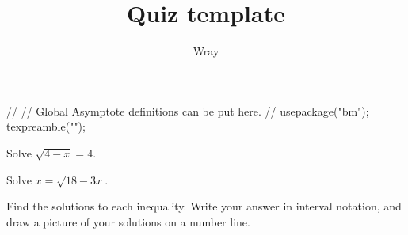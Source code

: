 \documentclass[addpoints, 12pt]{exam}
\title{Quiz template}
\author{Wray}
\begin{document}
\begin{asydef}
//
// Global Asymptote definitions can be put here.
//
usepackage("bm");
texpreamble("\def\V#1{\bm{#1}}");
\end{asydef}



\bigskip

             
\bigskip
\bigskip

\smallskip

\begin{questions}

\question[3]
Solve $\sqrt{4-x} = 4$.


\question[5]
Solve $x = \sqrt{18 - 3x}$.


\newpage

\question
Find the solutions to each inequality.  Write your answer in interval notation, and draw a picture of your solutions on a number line.


\end{questions}
\end{document}
